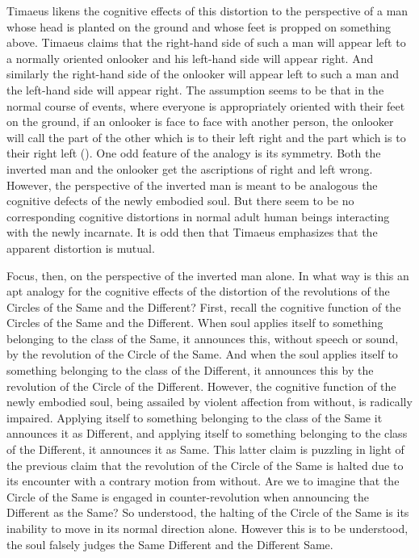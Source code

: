 Timaeus likens the cognitive effects of this distortion to the perspective of a man whose head is planted on the ground and whose feet is propped on something above. Timaeus claims that the right-hand side of such a man will appear left to a normally oriented onlooker and his left-hand side will appear right. And similarly the right-hand side of the onlooker will appear left to such a man and the left-hand side will appear right. The assumption seems to be that in the normal course of events, where everyone is appropriately oriented with their feet on the ground, if an onlooker is face to face with another person, the onlooker will call the part of the other which is to their left right and the part which is to their right left (\citealt[271]{Taylor:1928qb}). One odd feature of the analogy is its symmetry. Both the inverted man and the onlooker get the ascriptions of right and left wrong. However, the perspective of the inverted man is meant to be analogous the cognitive defects of the newly embodied soul. But there seem to be no corresponding cognitive distortions in normal adult human beings interacting with the newly incarnate. It is odd then that Timaeus emphasizes that the apparent distortion is mutual.

Focus, then, on the perspective of the inverted man alone. In what way is this an apt analogy for the cognitive effects of the distortion of the revolutions of the Circles of the Same and the Different? First, recall the cognitive function of the Circles of the Same and the Different. When soul applies itself to something belonging to the class of the Same, it announces this, without speech or sound, by the revolution of the Circle of the Same. And when the soul applies itself to something belonging to the class of the Different, it announces this by the revolution of the Circle of the Different. However, the cognitive function of the newly embodied soul, being assailed by violent affection from without, is radically impaired. Applying itself to something belonging to the class of the Same it announces it as Different, and applying itself to something belonging to the class of the Different, it announces it as Same. This latter claim is puzzling in light of the previous claim that the revolution of the Circle of the Same is halted due to its encounter with a contrary motion from without. Are we to imagine that the Circle of the Same is engaged in counter-revolution when announcing the Different as the Same? So understood, the halting of the Circle of the Same is its inability to move in its normal direction alone. However this is to be understood, the soul falsely judges the Same Different and the Different Same. 

